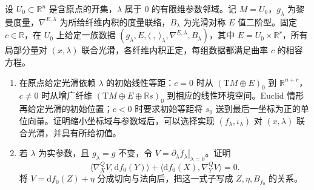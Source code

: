 \begin{exercise}\label{g3:ex:fundamental-theorem-smooth-families}
	设 \(U_0\subset\mathbb R^n\) 是含原点的开集，\(\lambda\) 属于 \(0\) 的有限维参数邻域。记 \(M=U_0\)，\(g_\lambda\) 为黎曼度量，\(\nabla^{E,\lambda}\) 为所给纤维内积的度量联络，\(B_\lambda\) 为光滑对称 \(E\) 值二阶型。固定 \(c\in\mathbb R\)，在 \(U_0\) 上给定一族数据 \((g_\lambda,E,\langle\ ,\ \rangle_\lambda,\nabla^{E,\lambda},B_\lambda)\)，其中 \(E=U_0\times\mathbb R^r\)，所有局部分量对 \((x,\lambda)\) 联合光滑，各纤维内积正定，每组数据都满足曲率 \(c\) 的相容方程。
	\begin{enumerate}
		\item 在原点给定光滑依赖 \(\lambda\) 的初始线性等距：\(c=0\) 时从 \((\mathrm TM\oplus E)_0\) 到 \(\mathbb R^{n+r}\)，\(c\ne0\) 时从增广纤维 \((\mathrm TM\oplus E\oplus\mathbb Rs)_0\) 到相应的线性环境空间。Euclid 情形再给定光滑的初始位置；\(c<0\) 时要求初始等距将 \(s_0\) 送到最后一坐标为正的单位向量。证明缩小坐标域与参数域后，可以选择实现 \((f_\lambda,\iota_\lambda)\) 对 \((x,\lambda)\) 联合光滑，并具有所给初值。
		\item 若 \(\lambda\) 为实参数，且 \(g_\lambda=g\) 不变，令 \(V=\left.\partial_\lambda f_\lambda\right|_{\lambda=0}\)。证明
		\[
			\langle\nabla^{Q}_X V,\mathrm df_0(Y)\rangle
			+\langle\mathrm df_0(X),\nabla^{Q}_Y V\rangle=0.
		\]
		将 \(V=\mathrm df_0(Z)+\eta\) 分成切向与法向后，把这一式子写成 \(Z,\eta,B_{f_0}\) 的关系。
	\end{enumerate}
\end{exercise}
